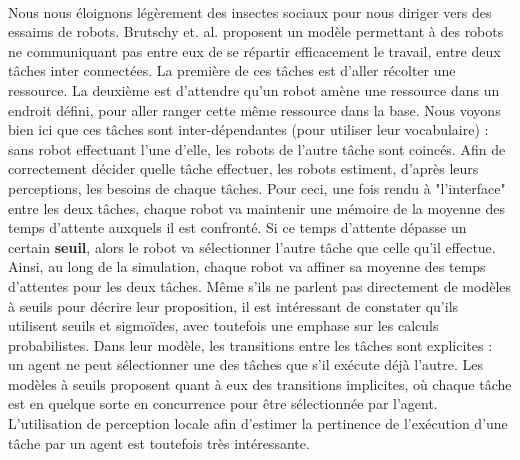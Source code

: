         \paragraph{}
		Nous nous éloignons légèrement des insectes sociaux pour nous diriger vers des essaims de robots. Brutschy et. al. \cite{brutschy_self-organized_2014} proposent un modèle permettant à des robots ne communiquant pas entre eux de se répartir efficacement le travail, entre deux tâches inter connectées. La première de ces tâches est d'aller récolter une ressource. La deuxième est d'attendre qu'un robot amène une ressource dans un endroit défini, pour aller ranger cette même ressource dans la base. Nous voyons bien ici que ces tâches sont inter-dépendantes (pour utiliser leur vocabulaire) : sans robot effectuant l'une d'elle, les robots de l'autre tâche sont coincés. Afin de correctement décider quelle tâche effectuer, les robots estiment, d'après leurs perceptions, les besoins de chaque tâches. Pour ceci, une fois rendu à "l'interface" entre les deux tâches, chaque robot va maintenir une mémoire de la moyenne des temps d'attente auxquels il est confronté. Si ce temps d'attente dépasse un certain \textbf{seuil}, alors le robot va sélectionner l'autre tâche que celle qu'il effectue. Ainsi, au long de la simulation, chaque robot va affiner sa moyenne des temps d'attentes pour les deux tâches. Même s'ils ne parlent pas directement de modèles à seuils pour décrire leur proposition, il est intéressant de constater qu'ils utilisent seuils et sigmoïdes, avec toutefois une emphase sur les calculs probabilistes. Dans leur modèle, les transitions entre les tâches sont explicites : un agent ne peut sélectionner une des tâches que s'il exécute déjà l'autre. Les modèles à seuils proposent quant à eux des transitions implicites, où chaque tâche est en quelque sorte en concurrence pour être sélectionnée par l'agent. L'utilisation de perception locale afin d'estimer la pertinence de l'exécution d'une tâche par un agent est toutefois très intéressante.
        
